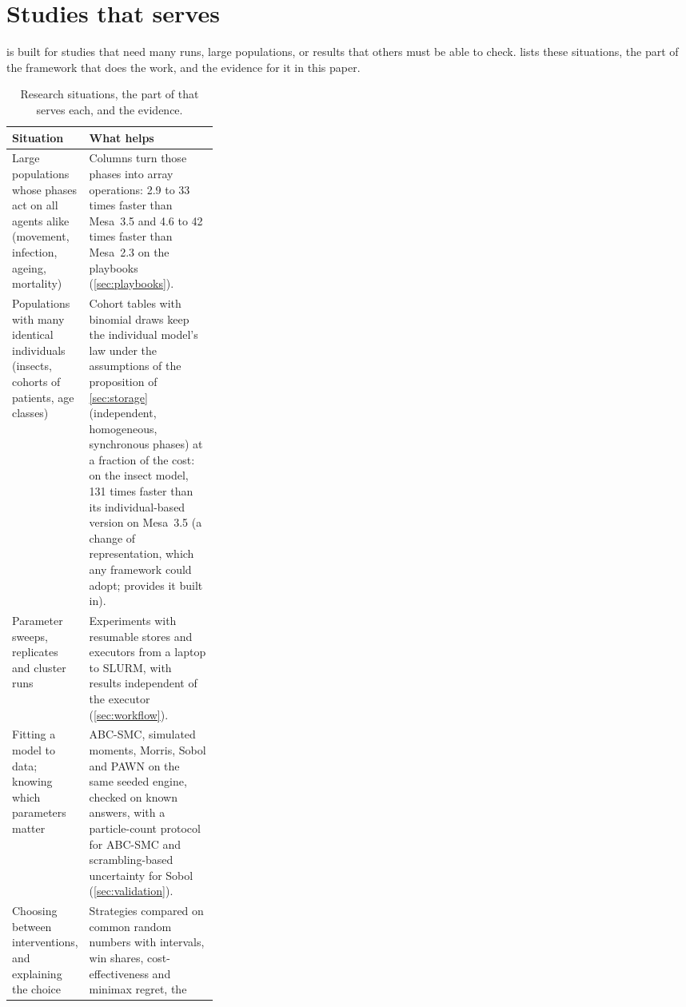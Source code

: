 \section{Studies that \modelly{} serves}
\label{sec:usecases}

\modelly{} is built for studies that need many runs, large populations, or results that others
must be able to check.  lists these situations, the part of the framework
that does the work, and the evidence for it in this paper.

\begin{table}[htbp]
  \centering
  \small
  \caption{Research situations, the part of \modelly{} that serves each, and the evidence.}
  \label{tab:usecases}
  \begin{tabularx}{\linewidth}{>{\raggedright\arraybackslash}p{0.30\linewidth}X}
    \toprule
    Situation & What helps \\
    \midrule
    Large populations whose phases act on all agents alike (movement, infection, ageing,
    mortality) & Columns turn those phases into array operations: 2.9 to 33 times faster than
    Mesa~3.5 and 4.6 to 42 times faster than Mesa~2.3 on the playbooks (\cref{sec:playbooks}). \\ \addlinespace
    Populations with many identical individuals (insects, cohorts of patients, age classes)
    & Cohort tables with binomial draws keep the individual model's law under the
    assumptions of the proposition of \cref{sec:storage} (independent, homogeneous,
    synchronous phases) at a fraction of the cost: on the insect model, 131 times faster
    than its individual-based version on Mesa~3.5 (a change of representation, which any
    framework could adopt; \modelly{} provides it built in). \\ \addlinespace
    Parameter sweeps, replicates and cluster runs & Experiments with resumable stores and
    executors from a laptop to SLURM, with results independent of the executor (\cref{sec:workflow}). \\ \addlinespace
    Fitting a model to data; knowing which parameters matter & ABC-SMC, simulated moments,
    Morris, Sobol and PAWN on the same seeded engine, checked on known answers, with a
    particle-count protocol for ABC-SMC and scrambling-based uncertainty for Sobol
    (\cref{sec:validation}). \\ \addlinespace
    Choosing between interventions, and explaining the choice & Strategies compared on common
    random numbers with intervals, win shares, cost-effectiveness and minimax regret, the

\end{tabularx}
\end{table}
